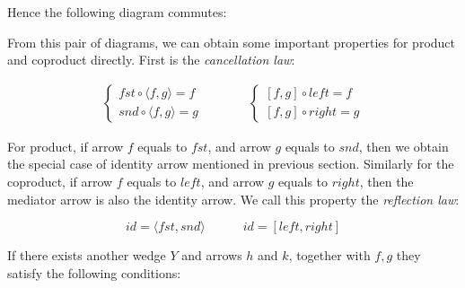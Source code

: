 \documentclass[b5paper]{article}
\begin{document}
Hence the following diagram commutes:

\begin{center}
\end{center}

From this pair of diagrams, we can obtain some important properties for product and coproduct directly. First is the {\em cancellation law}:

\[
\begin{array}{rcl}
\begin{cases}
fst \circ \langle f, g \rangle = f \\
snd \circ \langle f, g \rangle = g
\end{cases}
& \quad \quad &
\begin{cases}
[f, g] \circ left = f \\
[f, g] \circ right = g
\end{cases}
\end{array}
\]

For product, if arrow $f$ equals to $fst$, and arrow $g$ equals to $snd$, then we obtain the special case of identity arrow mentioned in previous section. Similarly for the coproduct, if arrow $f$ equals to $left$, and arrow $g$ equals to $right$, then the mediator arrow is also the identity arrow. We call this property the {\em reflection law}:

\[
id = \langle fst, snd \rangle \quad \quad \quad id = [left, right]
\]

If there exists another wedge $Y$ and arrows $h$ and $k$, together with $f, g$ they satisfy the following conditions:
\end{document}
